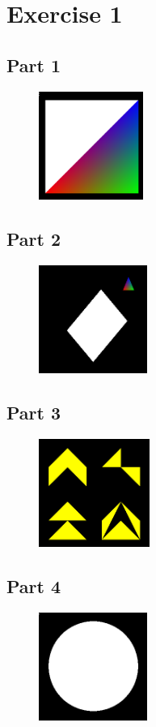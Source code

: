\section{Exercise 1}
\subsection{Part 1}
\begin{figure}[h]
  \centering
  \includegraphics[height=100pt]{images/exer_1_1}
\end{figure}

\subsection{Part 2}
\begin{figure}[h]
  \centering
  \includegraphics[height=100pt]{images/exer_1_2}
\end{figure}

\subsection{Part 3}
\begin{figure}[h]
  \centering
  \includegraphics[height=100pt]{images/exer_1_3}
\end{figure}

\subsection{Part 4}
\begin{figure}[h]
  \centering
  \includegraphics[height=100pt]{images/exer_1_4}
\end{figure}

